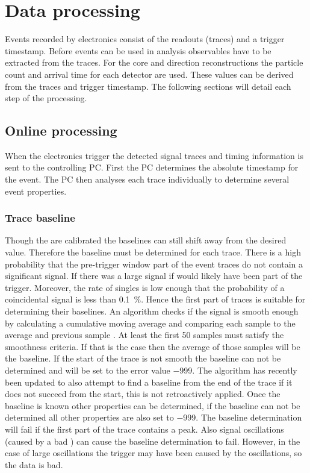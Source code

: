 \chapter{Data processing}
\label{ch:data_processing}

Events recorded by \hisparc electronics consist of the \pmt readouts (traces) and a trigger timestamp. Before events can be used in analysis observables have to be extracted from the traces. For the core and direction reconstructions the particle count and arrival time for each detector are used. These values can be derived from the traces and trigger timestamp. The following sections will detail each step of the processing.


\section{Online processing}
\label{sec:online}

When the \hisparc electronics trigger the detected signal traces and timing information is sent to the controlling PC. First the PC determines the absolute \gps timestamp for the event. The PC then analyses each trace individually to determine several event properties.


\subsection{Trace baseline}

Though the \adcs are calibrated the baselines can still shift away from the desired value. Therefore the baseline must be determined for each trace. There is a high probability that the pre-trigger window part of the event traces do not contain a significant signal. If there was a large signal if would likely have been part of the trigger. Moreover, the rate of singles is low enough that the probability of a coincidental signal is less than \SI{0.1}{\percent}. Hence the first part of traces is suitable for determining their baselines. An algorithm checks if the signal is smooth enough by calculating a cumulative moving average and comparing each sample to the average and previous sample \cite{oostenbrugge2014daq}. At least the first 50 samples must satisfy the smoothness criteria. If that is the case then the average of those samples will be the baseline. If the start of the trace is not smooth the baseline can not be determined and will be set to the error value \num{-999}. The algorithm has recently been updated to also attempt to find a baseline from the end of the trace if it does not succeed from the start, this is not retroactively applied. Once the baseline is known other properties can be determined, if the baseline can not be determined all other properties are also set to \num{-999}. The baseline determination will fail if the first part of the trace contains a peak. Also signal oscillations (caused by a bad \pmt) can cause the baseline determination to fail. However, in the case of large oscillations the trigger may have been caused by the oscillations, so the data is bad.


